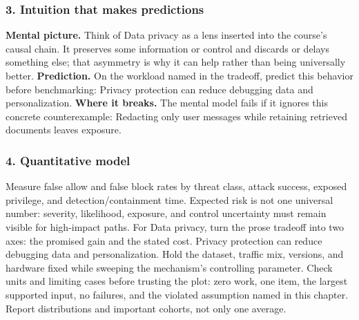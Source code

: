 \subsubsection*{3. Intuition that makes predictions}
\textbf{Mental picture.} Think of Data privacy as a lens inserted into the course's causal chain. It preserves some information or control and discards or delays something else; that asymmetry is why it can help rather than being universally better.
\textbf{Prediction.} On the workload named in the tradeoff, predict this behavior before benchmarking: Privacy protection can reduce debugging data and personalization.
\textbf{Where it breaks.} The mental model fails if it ignores this concrete counterexample: Redacting only user messages while retaining retrieved documents leaves exposure.
\subsubsection*{4. Quantitative model}
Measure false allow and false block rates by threat class, attack success, exposed privilege, and detection/containment time. Expected risk is not one universal number: severity, likelihood, exposure, and control uncertainty must remain visible for high-impact paths.
For Data privacy, turn the prose tradeoff into two axes: the promised gain and the stated cost. Privacy protection can reduce debugging data and personalization. Hold the dataset, traffic mix, versions, and hardware fixed while sweeping the mechanism's controlling parameter.
Check units and limiting cases before trusting the plot: zero work, one item, the largest supported input, no failures, and the violated assumption named in this chapter. Report distributions and important cohorts, not only one average.
